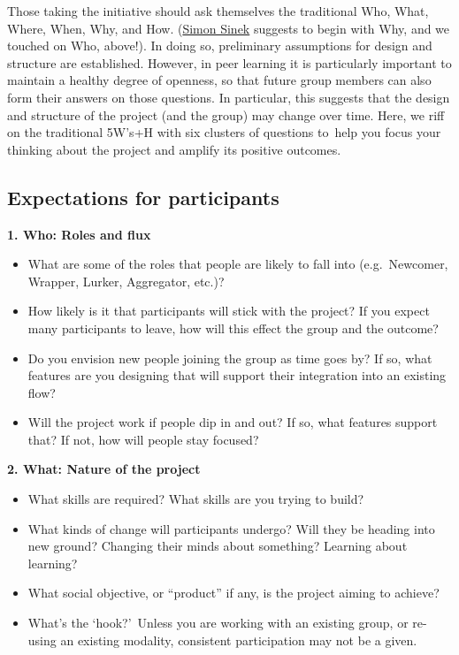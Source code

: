 Those taking the initiative should ask themselves the traditional Who,
What, Where, When, Why, and How.
(\href{http://en.wikipedia.org/wiki/Simon_Sinek}{Simon Sinek} suggests
to begin with Why, and we touched on Who, above!). In doing so,
preliminary assumptions for design and structure are established.
However, in peer learning it is particularly important to maintain a
healthy degree of openness, so that future group members can also form
their answers on those questions. In particular, this suggests that the
design and structure of the project (and the group) may change over
time. Here, we riff on the traditional 5W's+H with six clusters of
questions to~help you focus your thinking about the project and amplify
its positive outcomes.

\subsection{Expectations for
participants}\label{expectations-for-participants}

\textbf{1. Who: Roles and flux}

\begin{itemize}
\itemsep1pt\parskip0pt
\item
  What are some of the roles that people are likely to fall into
  (e.g.~Newcomer, Wrapper, Lurker, Aggregator, etc.)?
\item
  How likely is it that participants will stick with the project? If you
  expect many participants to leave, how will this effect the group and
  the outcome?
\item
  Do you envision new people joining the group as time goes by? If so,
  what features are you designing that will support their integration
  into an existing flow?
\item
  Will the project work if people dip in and out? If so, what features
  support that? If not, how will people stay focused?
\end{itemize}

\textbf{2. What: Nature of the project}

\begin{itemize}
\itemsep1pt\parskip0pt
\item
  What skills are required? What skills are you trying to build?
\item
  What kinds of change will participants undergo? Will they be heading
  into new ground? Changing their minds about something? Learning about
  learning?
\item
  What social objective, or ``product'' if any, is the project aiming to
  achieve?
\item
  What's the `hook?'~Unless you are working with an existing group, or
  re-using an existing modality, consistent participation may not be a
  given.
\end{itemize}

